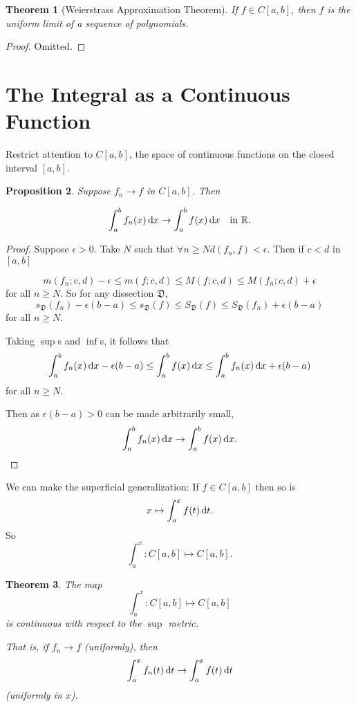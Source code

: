 \documentclass{notes}
\theoremstyle{plain}
\newtheorem{proposition}{Proposition}[chapter]
\newtheorem{theorem}[proposition]{Theorem}
\newcommand{\dis}{\mathfrak{D}}
\begin{document}
\begin{theorem}[Weierstrass Approximation Theorem]
If $ f \in C[a,b] $, then $ f $ is the uniform limit of a 
sequence of polynomials.
\end{theorem}

\begin{proof} Omitted. \end{proof}

\section{The Integral as a Continuous Function}

Restrict attention to $ C[a,b] $, the space of continuous functions 
on the closed interval $ [a,b] $.

\begin{proposition}
Suppose $ f_{n} \to f $ in $ C[a,b] $. Then

\[
\int_{a}^{b}f_{n}(x)\,\mathrm{d} x \to \int_{a}^{b}f(x)\,\mathrm{d} x \quad \text{in
  $\mathbb{R}$.}
\]
\end{proposition}

\begin{proof}
Suppose $ \epsilon>0 $.
Take $ N $ such that $\forall n \geq N d(f_{n},f)<\epsilon$. 
Then if $ c<d $ in $ [a,b] $

\[
m(f_{n};c,d)-\epsilon \leq m(f;c,d) \leq M(f;c,d) \leq
M(f_{n};c,d)+\epsilon
\]
for all $ n \geq N $.
So for any dissection $ \dis $,
\[
s_{\dis}(f_{n})-\epsilon(b-a) \leq s_{\dis}(f) \leq S_{\dis}(f) 
\leq S_{\dis}(f_{n}) +\epsilon(b-a)
\] for all $ n \geq N $.

Taking $ \sup $s and $ \inf $s, it follows that
\[
\int_{a}^{b}f_{n}(x)\,\mathrm{d} x - \epsilon(b-a) \leq \int_{a}^{b}f(x) \,\mathrm{d} x 
\leq \int_{a}^{b}f_{n}(x)\,\mathrm{d} x + \epsilon(b-a)
\] for all $ n \geq N $.

Then as $ \epsilon(b-a)>0 $ can be made arbitrarily small,
\[
\int_{a}^{b}f_{n}(x) \,\mathrm{d} x \to \int_{a}^{b}f(x)\,\mathrm{d} x.
\]
\end{proof}

We can make the superficial generalization: If $ f \in C[a,b] $ then 
so is \[ x \mapsto \int_{a}^{x}f(t)\,\mathrm{d} t. \] So
\[ \int_{a}^{x}\colon C[a,b] \mapsto C[a,b]. \]

\begin{theorem}\label{thm:uc-int}
The map
\[
\int_{a}^{x}\colon C[a,b] \mapsto C[a,b]
\] is continuous with respect to the $ \sup $ metric.

That is, if $ f_{n} \to f $ (uniformly), then
\[ \int_{a}^{x}f_{n}(t)\,\mathrm{d} t \to \int_{a}^{x}f(t)\,\mathrm{d} t \] 
(uniformly in $ x $).
\end{theorem}
\end{document}
